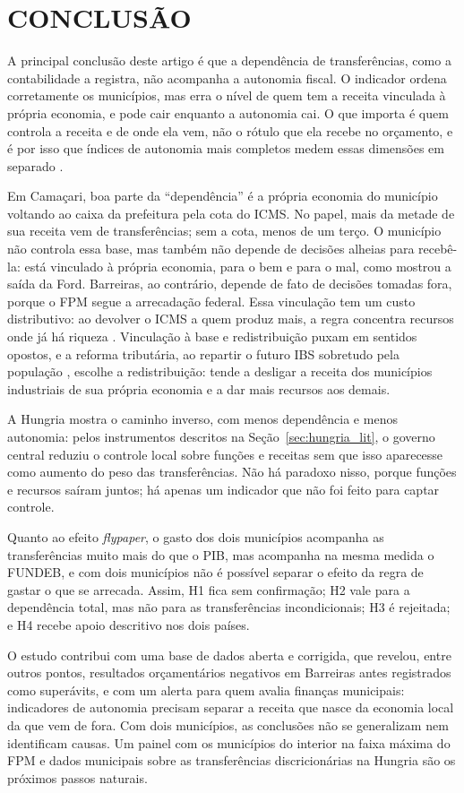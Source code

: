 \section{CONCLUSÃO}\label{sec:conclusao}

A principal conclusão deste artigo é que a dependência de transferências, como a contabilidade a registra, não acompanha a autonomia fiscal. O indicador ordena corretamente os municípios, mas erra o nível de quem tem a receita vinculada à própria economia, e pode cair enquanto a autonomia cai. O que importa é quem controla a receita e de onde ela vem, não o rótulo que ela recebe no orçamento, e é por isso que índices de autonomia mais completos medem essas dimensões em separado \citep{Ladner2016}.

Em Camaçari, boa parte da ``dependência'' é a própria economia do município voltando ao caixa da prefeitura pela cota do ICMS. No papel, mais da metade de sua receita vem de transferências; sem a cota, menos de um terço. O município não controla essa base, mas também não depende de decisões alheias para recebê-la: está vinculado à própria economia, para o bem e para o mal, como mostrou a saída da Ford. Barreiras, ao contrário, depende de fato de decisões tomadas fora, porque o FPM segue a arrecadação federal. Essa vinculação tem um custo distributivo: ao devolver o ICMS a quem produz mais, a regra concentra recursos onde já há riqueza \citep{daCosta2024}. Vinculação à base e redistribuição puxam em sentidos opostos, e a reforma tributária, ao repartir o futuro IBS sobretudo pela população \citep{EC132}, escolhe a redistribuição: tende a desligar a receita dos municípios industriais de sua própria economia e a dar mais recursos aos demais.

A Hungria mostra o caminho inverso, com menos dependência e menos autonomia: pelos instrumentos descritos na Seção~\ref{sec:hungria_lit}, o governo central reduziu o controle local sobre funções e receitas sem que isso aparecesse como aumento do peso das transferências. Não há paradoxo nisso, porque funções e recursos saíram juntos; há apenas um indicador que não foi feito para captar controle.

Quanto ao efeito \textit{flypaper}, o gasto dos dois municípios acompanha as transferências muito mais do que o PIB, mas acompanha na mesma medida o FUNDEB, e com dois municípios não é possível separar o efeito da regra de gastar o que se arrecada. Assim, H1 fica sem confirmação; H2 vale para a dependência total, mas não para as transferências incondicionais; H3 é rejeitada; e H4 recebe apoio descritivo nos dois países.

O estudo contribui com uma base de dados aberta e corrigida, que revelou, entre outros pontos, resultados orçamentários negativos em Barreiras antes registrados como superávits, e com um alerta para quem avalia finanças municipais: indicadores de autonomia precisam separar a receita que nasce da economia local da que vem de fora. Com dois municípios, as conclusões não se generalizam nem identificam causas. Um painel com os municípios do interior na faixa máxima do FPM \citep{Bernardelli2026, Castro2021221} e dados municipais sobre as transferências discricionárias na Hungria são os próximos passos naturais.
